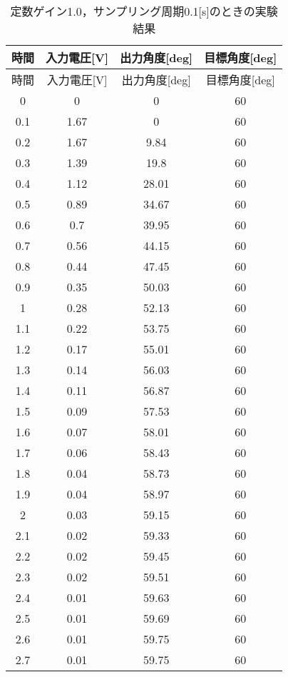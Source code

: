 \begin{longtable}[c]{|c|c|c|c|}
  \caption{定数ゲイン1.0，サンプリング周期0.1[s]のときの実験結果}
  \label{tab3} \\
  \hline
   時間& 	入力電圧[V]&	出力角度[deg]&	目標角度[deg] \\ \hline \hline \endfirsthead 
\hline \endhead
\hline \endfoot
\hline \endlastfoot
時間& 	入力電圧[V]&    出力角度[deg]&	目標角度[deg] \\ \hline
0   & 	0    & 0      & 	60 \\ \hline 
0.1 & 	1.67 & 	0     & 	60 \\ \hline 
0.2 & 	1.67 & 	9.84  & 	60 \\ \hline 
0.3 & 	1.39 & 	19.8  & 	60 \\ \hline 
0.4 & 	1.12 & 	28.01 & 	60 \\ \hline 
0.5 & 	0.89 & 	34.67 & 	60 \\ \hline 
0.6 & 	0.7  & 	39.95 & 	60 \\ \hline 
0.7 & 	0.56 & 	44.15 & 	60 \\ \hline 
0.8 & 	0.44 & 	47.45 & 	60 \\ \hline 
0.9 & 	0.35 & 	50.03 & 	60 \\ \hline 
1   & 	0.28 & 	52.13 & 	60 \\ \hline 
1.1 & 	0.22 & 	53.75 & 	60 \\ \hline 
1.2 & 	0.17 & 	55.01 & 	60 \\ \hline 
1.3 & 	0.14 & 	56.03 & 	60 \\ \hline 
1.4 & 	0.11 & 	56.87 & 	60 \\ \hline 
1.5 & 	0.09 & 	57.53 & 	60 \\ \hline 
1.6 & 	0.07 & 	58.01 & 	60 \\ \hline 
1.7 & 	0.06 & 	58.43 & 	60 \\ \hline 
1.8 & 	0.04 & 	58.73 & 	60 \\ \hline 
1.9 & 	0.04 & 	58.97 & 	60 \\ \hline 
2   & 	0.03 & 	59.15 & 	60 \\ \hline 
2.1 & 	0.02 & 	59.33 & 	60 \\ \hline 
2.2 & 	0.02 & 	59.45 & 	60 \\ \hline 
2.3 & 	0.02 & 	59.51 & 	60 \\ \hline 
2.4 & 	0.01 & 	59.63 & 	60 \\ \hline 
2.5 & 	0.01 & 	59.69 & 	60 \\ \hline 
2.6 & 	0.01 & 	59.75 & 	60 \\ \hline 
2.7 & 	0.01 & 	59.75 & 	60 \\ \hline 

\end{longtable}
